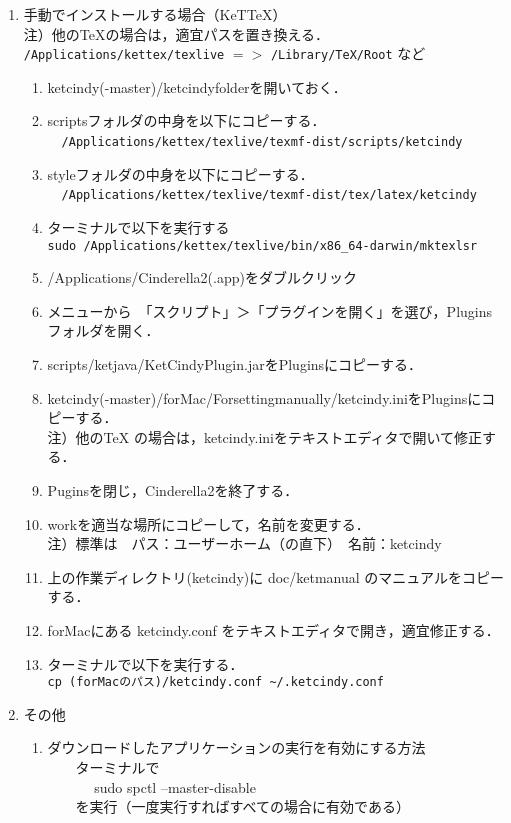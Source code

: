\documentclass{ujarticle}
\begin{document}
\begin{enumerate}[\bf\large 1.]
\item 手動でインストールする場合（KeTTeX）\\
\hspace*{1zw}注）他のTeXの場合は，適宜パスを置き換える．\\
\hspace*{3zw}\verb|/Applications/kettex/texlive| $=>$ \verb|/Library/TeX/Root| など
  \begin{enumerate}[(1)]
  \item ketcindy(-master)/ketcindyfolderを開いておく．
  \item scriptsフォルダの中身を以下にコピーする．\\
　\verb|/Applications/kettex/texlive/texmf-dist/scripts/ketcindy|
  \item styleフォルダの中身を以下にコピーする．\\
　\verb|/Applications/kettex/texlive/texmf-dist/tex/latex/ketcindy|
  \item ターミナルで以下を実行する\\
  \hspace*{1zw}\verb|sudo /Applications/kettex/texlive/bin/x86_64-darwin/mktexlsr|
  \item /Applications/Cinderella2(.app)をダブルクリック
  \item メニューから　「スクリプト」＞「プラグインを開く」を選び，Pluginsフォルダを開く．
  \item scripts/ketjava/KetCindyPlugin.jarをPluginsにコピーする．
  \item ketcindy(-master)/forMac/Forsettingmanually/ketcindy.iniをPluginsにコピーする．\\
  \hspace*{2zw}注）他のTeX の場合は，ketcindy.iniをテキストエディタで開いて修正する．
  \item Puginsを閉じ，Cinderella2を終了する．
  \item workを適当な場所にコピーして，名前を変更する．\\
\hspace*{2zw}注）標準は　パス：ユーザーホーム（の直下）　名前：ketcindy
  \item 上の作業ディレクトリ(ketcindy)に doc/ketmanual のマニュアルをコピーする．
  \item forMacにある ketcindy.conf をテキストエディタで開き，適宜修正する．
  \item ターミナルで以下を実行する．\\
  \hspace*{1zw}\verb|cp (forMacのパス)/ketcindy.conf ~/.ketcindy.conf|
  \end{enumerate}

\item その他
\begin{enumerate}[(1)]
\item ダウンロードしたアプリケーションの実行を有効にする方法\\
　　ターミナルで\\
　　　    sudo spctl --master-disable\\
　　を実行（一度実行すればすべての場合に有効である）
 \end{enumerate}

\end{enumerate}
\end{document}
